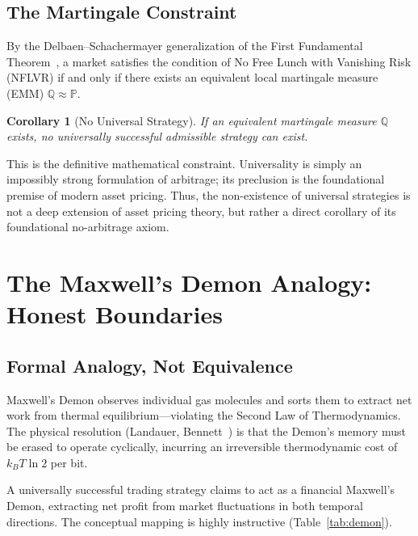 \documentclass[aps,pra,reprint,superscriptaddress,amsmath,amssymb]{revtex4-2}
\theoremstyle{plain}
\newtheorem{corollary}[theorem]{Corollary}
\theoremstyle{definition}
\theoremstyle{remark}
\begin{document}
\subsection{The Martingale Constraint}

By the Delbaen--Schachermayer generalization of the First Fundamental Theorem~\cite{Harrison1981,Delbaen1994}, a market satisfies the condition of No Free Lunch with Vanishing Risk (NFLVR) if and only if there exists an equivalent local martingale measure (EMM) $\mathbb{Q} \approx \mathbb{P}$.

\begin{corollary}[No Universal Strategy]
  \label{cor:noarb}
  If an equivalent martingale measure $\mathbb{Q}$ exists, no universally successful admissible strategy can exist.
\end{corollary}

This is the definitive mathematical constraint. Universality is simply an impossibly strong formulation of arbitrage; its preclusion is the foundational premise of modern asset pricing.
Thus, the non-existence of universal strategies is not a deep extension of asset pricing theory, but rather a direct corollary of its foundational no-arbitrage axiom.

\section{The Maxwell's Demon Analogy: Honest Boundaries}
\label{sec:demon}

\subsection{Formal Analogy, Not Equivalence}

Maxwell's Demon observes individual gas molecules and sorts them to extract net work from thermal equilibrium---violating the Second Law of Thermodynamics. The physical resolution (Landauer, Bennett~\cite{landauer:61,bennett-82}) is that the Demon's memory must be erased to operate cyclically, incurring an irreversible thermodynamic cost of $k_BT\ln 2$ per bit.

A universally successful trading strategy claims to act as a financial Maxwell's Demon, extracting net profit from market fluctuations in both temporal directions. The conceptual mapping is highly instructive (Table~\ref{tab:demon}).
\end{document}
